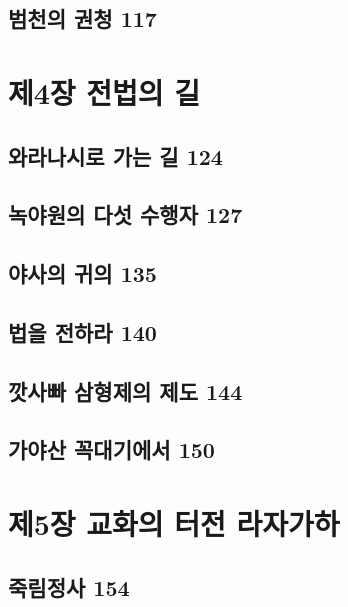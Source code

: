 \documentclass[12pt, a4paper, oneside]{book}
\let\stdsection\section
\renewcommand\section{\newpage\stdsection}
\begin{document}
	\section{범천의 권청 117}





	\chapter{제4장 전법의 길}
	\noptcrule
	\parttoc				

	\section{와라나시로 가는 길 124 }

	\section{녹야원의 다섯 수행자 127 }

	\section{야사의 귀의 135 }

	\section{법을 전하라 140 }

	\section{깟사빠 삼형제의 제도 144 }

	\section{가야산 꼭대기에서 150}





	\chapter{제5장 교화의 터전 라자가하}
	\noptcrule
	\parttoc				

	\section{죽림정사 154 }
\end{document}
